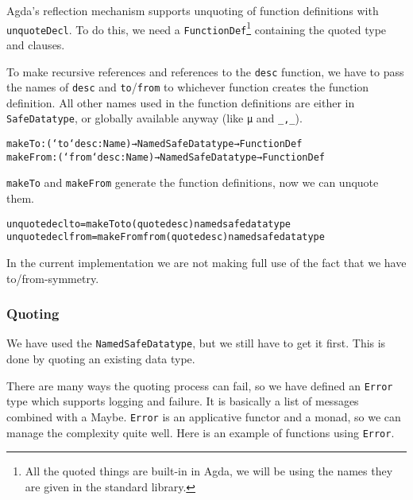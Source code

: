 Agda's reflection mechanism supports unquoting of function definitions
with \texttt{unquoteDecl}.
To do this, we need a \texttt{FunctionDef}\footnote{All the quoted
  things are built-in in Agda, we will be using the names they are
  given in the standard library.} containing the quoted type and
clauses.

To make recursive references and references to the \texttt{desc}
function, we have to pass the names of \texttt{desc} and
\texttt{to}/\texttt{from} to whichever function creates the function
definition.
All other names used in the function definitions are either in
\texttt{SafeDatatype}, or globally available anyway (like \texttt{μ}
and \texttt{\_,\_}).

\begin{alltt}
makeTo : (`to `desc : Name) → NamedSafeDatatype → FunctionDef
makeFrom : (`from `desc : Name) → NamedSafeDatatype → FunctionDef
\end{alltt}

\texttt{makeTo} and \texttt{makeFrom} generate the function
definitions, now we can unquote them.

\begin{alltt}
unquotedecl to = makeTo to (quote desc) namedsafedatatype
unquotedecl from = makeFrom from (quote desc) namedsafedatatype
\end{alltt}

\begin{remark}
In the current implementation we are not making full use of the fact
that we have to/from-symmetry.
\end{remark}

\subsubsection[Quoting]{Quoting}
\label{sec:prototype-quoting}

We have used the \texttt{NamedSafeDatatype}, but we still have to get
it first.
This is done by quoting an existing data type.

There are many ways the quoting process can fail, so we have defined
an \texttt{Error} type which supports logging
and failure.
It is basically a list of messages combined with a Maybe.
\texttt{Error} is an applicative functor and a monad, so we can manage
the complexity quite well.
Here is an example of functions using \texttt{Error}.


